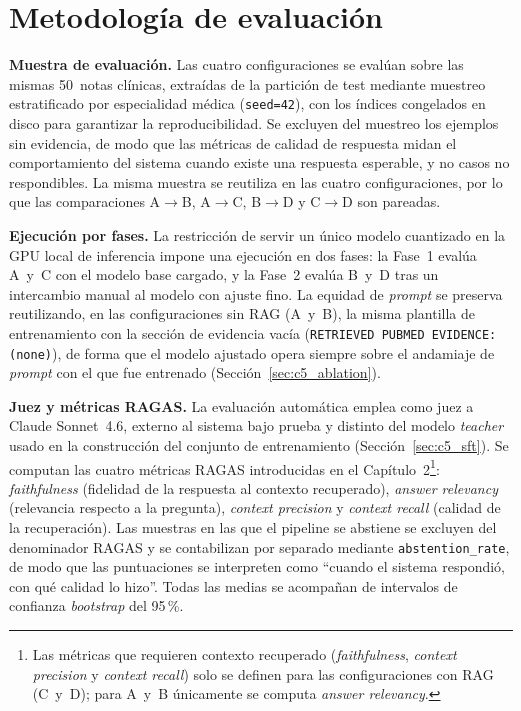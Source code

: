 \documentclass[11pt,a4paper,spanish]{book}
\numberwithin{equation}{chapter}
\numberwithin{figure}{chapter}
\begin{document}
\section{Metodología de evaluación}
\label{sec:c6_metodologia}

\textbf{Muestra de evaluación.} Las cuatro configuraciones se evalúan sobre las mismas 50~notas clínicas, extraídas de la partición de test mediante muestreo estratificado por especialidad médica (\texttt{seed=42}), con los índices congelados en disco para garantizar la reproducibilidad. Se excluyen del muestreo los ejemplos sin evidencia, de modo que las métricas de calidad de respuesta midan el comportamiento del sistema cuando existe una respuesta esperable, y no casos no respondibles. La misma muestra se reutiliza en las cuatro configuraciones, por lo que las comparaciones A$\to$B, A$\to$C, B$\to$D y C$\to$D son pareadas.

\textbf{Ejecución por fases.} La restricción de servir un único modelo cuantizado en la GPU local de inferencia impone una ejecución en dos fases: la Fase~1 evalúa A~y~C con el modelo base cargado, y la Fase~2 evalúa B~y~D tras un intercambio manual al modelo con ajuste fino. La equidad de \textit{prompt} se preserva reutilizando, en las configuraciones sin RAG (A~y~B), la misma plantilla de entrenamiento con la sección de evidencia vacía (\texttt{RETRIEVED PUBMED EVIDENCE: (none)}), de forma que el modelo ajustado opera siempre sobre el andamiaje de \textit{prompt} con el que fue entrenado (Sección~\ref{sec:c5_ablation}).

\textbf{Juez y métricas RAGAS.} La evaluación automática emplea como juez a Claude Sonnet~4.6, externo al sistema bajo prueba y distinto del modelo \textit{teacher} usado en la construcción del conjunto de entrenamiento (Sección~\ref{sec:c5_sft}). Se computan las cuatro métricas RAGAS introducidas en el Capítulo~2\footnote{Las métricas que requieren contexto recuperado (\textit{faithfulness}, \textit{context precision} y \textit{context recall}) solo se definen para las configuraciones con RAG (C~y~D); para A~y~B únicamente se computa \textit{answer relevancy}.}: \textit{faithfulness} (fidelidad de la respuesta al contexto recuperado), \textit{answer relevancy} (relevancia respecto a la pregunta), \textit{context precision} y \textit{context recall} (calidad de la recuperación). Las muestras en las que el pipeline se abstiene se excluyen del denominador RAGAS y se contabilizan por separado mediante \texttt{abstention\_rate}, de modo que las puntuaciones se interpreten como ``cuando el sistema respondió, con qué calidad lo hizo''. Todas las medias se acompañan de intervalos de confianza \textit{bootstrap} del 95\,\%.
\end{document}
